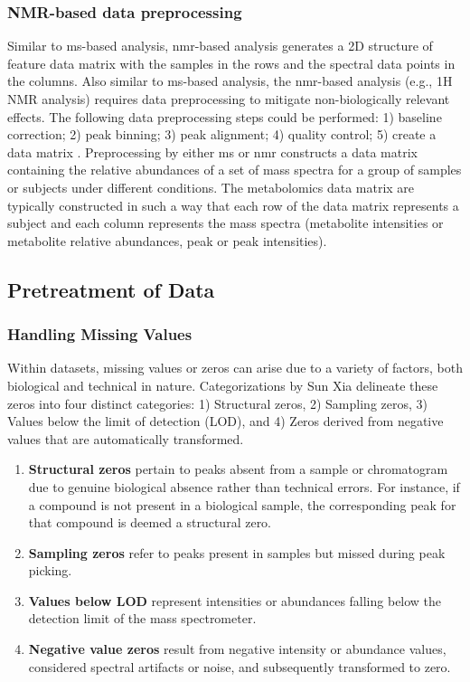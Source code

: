 \documentclass[ENG, BIB]{TFUOC}%
\begin{document}
\subsubsection{NMR-based data preprocessing}
Similar to \gls{ms}-based analysis, \gls{nmr}-based analysis generates a 2D structure of feature data matrix with the samples in the rows and the spectral data points in the columns. Also similar to \gls{ms}-based analysis, the \gls{nmr}-based analysis (e.g., 1H NMR analysis) requires data preprocessing to mitigate non-biologically relevant effects. The following data preprocessing steps could be performed: 1) baseline correction; 2) peak binning; 3) peak alignment; 4) quality control; 5) create a data matrix \cite{sunPretreatingNormalizingMetabolomics2024,martinPepsNMR1HNMR2018,trygg01BackgroundEstimation2009,alonsoAnalyticalMethodsUntargeted2015,bloembergWarpingMethodsSpectroscopic2013,borkChromatographicPeakAlignment2013,veselkovRecursiveSegmentwisePeak2009,sawallMultiobjectiveOptimizationAutomated2018}.
Preprocessing by either \gls{ms} or \gls{nmr} constructs a data matrix containing the relative abundances of a set of mass spectra for a group of samples or subjects under different conditions. The metabolomics data matrix are typically constructed in such a way that each row of the data matrix represents a subject and each column represents the mass spectra (metabolite intensities or metabolite relative abundances, peak or peak intensities).


\subsection{Pretreatment of Data}
\subsubsection{Handling Missing Values}
Within datasets, missing values or zeros can arise due to a variety of factors, both biological and technical in nature. Categorizations by Sun Xia delineate these zeros into four distinct categories: 1) Structural zeros, 2) Sampling zeros, 3) Values below the limit of detection (LOD), and 4) Zeros derived from negative values that are automatically transformed.
\begin{enumerate}
    \item \textbf{Structural zeros} pertain to peaks absent from a sample or chromatogram due to genuine biological absence rather than technical errors. For instance, if a compound is not present in a biological sample, the corresponding peak for that compound is deemed a structural zero.
    \item \textbf{Sampling zeros} refer to peaks present in samples but missed during peak picking.
    \item \textbf{Values below LOD} represent intensities or abundances falling below the detection limit of the mass spectrometer.
    \item \textbf{Negative value zeros} result from negative intensity or abundance values,
          considered spectral artifacts or noise, and subsequently transformed to zero.
\end{enumerate}
\end{document}
